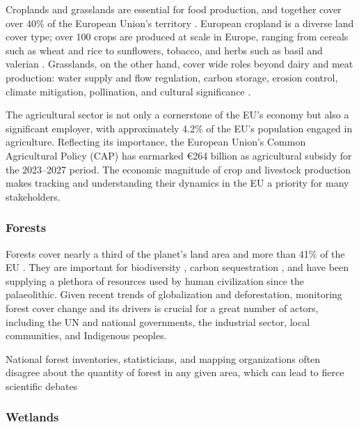         Croplands and grasslands are essential for food production, and together cover over 40\% of the European Union's territory \citep{eurostat2021land}. European cropland is a diverse land cover type; over 100 crops are produced at scale in Europe, ranging from cereals such as wheat and rice to sunflowers, tobacco, and herbs such as basil and valerian \citep{eurostat2023agricultural}. Grasslands, on the other hand, cover wide roles beyond dairy and meat production: water supply and flow regulation, carbon storage, erosion control, climate mitigation, pollination, and cultural significance \citep{bengtsson2019grasslands}. 
        
        The agricultural sector is not only a cornerstone of the EU's economy but also a significant employer, with approximately 4.2\% of the EU's population engaged in agriculture. Reflecting its importance, the European Union's Common Agricultural Policy (CAP) has earmarked €264 billion as agricultural subsidy for the 2023–2027 period. The economic magnitude of crop and livestock production makes tracking and understanding their dynamics in the EU a priority for many stakeholders.

    \subsubsection*{Forests}

        Forests cover nearly a third of the planet's land area \citep{fao2022,banskota2014forest} and more than 41\% of the EU \citep{eurostat2021land}. They are important for biodiversity \citep{cazzolla2022number}, carbon sequestration \citep{ipcc2021}, and have been supplying a plethora of resources used by human civilization since the palaeolithic. Given recent trends of globalization and deforestation, monitoring forest cover change and its drivers is crucial \citep{sy2019tropical,masolele2024mapping} for a great number of actors, including the UN and national governments, the industrial sector, local communities, and Indigenous peoples.

        National forest inventories, statisticians, and mapping organizations often disagree about the quantity of forest in any given area, which can lead to fierce scientific debates \citep{picard2021recent, korhonen2020new, palahi2021concerns, rossi2019assessing}
    
    \subsubsection*{Wetlands}

